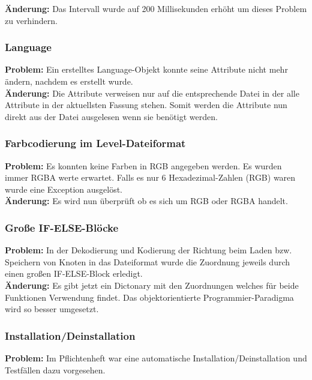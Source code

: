 \textbf{Änderung:} Das Intervall wurde auf 200 Millisekunden erhöht um dieses Problem zu verhindern.\\



\subsubsection*{Language}
\textbf{Problem:}
Ein erstelltes Language-Objekt konnte seine Attribute nicht mehr ändern, nachdem es erstellt wurde.\\

\textbf{Änderung:} Die Attribute verweisen nur auf die entsprechende Datei in der alle Attribute in der aktuellsten Fassung stehen. Somit werden die Attribute nun direkt aus der Datei ausgelesen wenn sie benötigt werden.\\



\subsubsection*{Farbcodierung im Level-Dateiformat}

\textbf{Problem:}
Es konnten keine Farben in RGB angegeben werden. Es wurden immer RGBA werte erwartet.
Falls es nur 6 Hexadezimal-Zahlen (RGB) waren wurde eine Exception ausgelöst.\\

\textbf{Änderung:} Es wird nun überprüft ob es sich um RGB oder RGBA handelt.\\



\subsubsection*{Große IF-ELSE-Blöcke}
\textbf{Problem:}
In der Dekodierung und Kodierung der Richtung beim Laden bzw. Speichern von Knoten in das Dateiformat wurde die Zuordnung jeweils durch einen großen IF-ELSE-Block erledigt.\\

\textbf{Änderung:} Es gibt jetzt ein Dictonary mit den Zuordnungen welches für beide Funktionen Verwendung findet. Das objektorientierte Programmier-Paradigma wird so besser umgesetzt.\\



\subsubsection*{Installation/Deinstallation}
\textbf{Problem:} Im Pflichtenheft war eine automatische Installation/Deinstallation und Testfällen dazu vorgesehen.\\

